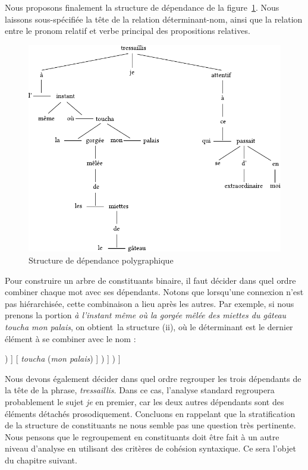 {    \pagebreak Nous proposons finalement la structure de dépendance de la figure~\ref{fig:proust}. Nous laissons sous-spécifiée la tête de la relation déterminant-nom, ainsi que la relation entre le pronom relatif et verbe principal des propositions relatives.
    
    \begin{figure}[H]
    \includegraphics[scale=.9]{figures/polygraphs/poly-3.4.31.pdf}
    \caption{Structure de dépendance polygraphique\label{fig:proust}}
    \end{figure}
    
    Pour construire un arbre de constituants binaire, il faut décider dans quel ordre combiner chaque mot avec ses dépendants. Notons que lorsqu’une connexion n’est pas hiérarchisée, cette combinaison a lieu après les autres. Par exemple, si nous prenons la portion \textit{à l’instant même où la gorgée mêlée des miettes du gâteau toucha mon palais}, on obtient~la structure (ii), où le déterminant est le dernier élément à se combiner avec le nom :
    
    \begin{exe}
    \relax
        [ \textit{à} ( \textit{l’} [ (\textit{instant même}) ( \textit{où} [ \textit{la} (\textit{gorgée} [\textit{mêlée des miettes du gâteau}] ) ] [ \textit{toucha} (\textit{mon palais}) ] ) ] ) ]
    \end{exe}
    Nous devons également décider dans quel ordre regrouper les trois dépendants de la tête de la phrase, \textit{tressaillis}. Dans ce cas, l’analyse standard regroupera probablement le sujet \textit{je} en premier, car les deux autres dépendants sont des éléments détachés prosodiquement. Concluons en rappelant que la stratification de la structure de constituants ne nous semble pas une question très pertinente. Nous pensons que le regroupement en constituants doit être fait à un autre niveau d’analyse en utilisant des critères de cohésion syntaxique. Ce sera l’objet du chapitre suivant.
 
}
